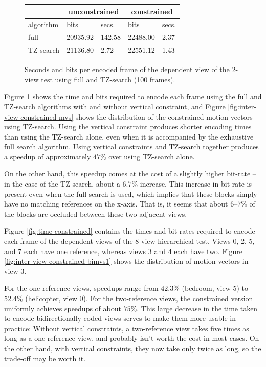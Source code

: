 \documentclass{sig-alternate-05-2015}
\begin{document}
\begin{figure}[H]
\centering\small
\begin{tabular}{|l|l|l|l|l|}
\multicolumn{1}{c}{} & \multicolumn{2}{c}{unconstrained} & \multicolumn{2}{c}{constrained} \\ \hline
algorithm            & bits            & secs.           & bits            & secs.         \\ \hline
full                 & 20935.92        & 142.58          & 22488.00        & 2.37          \\ \hline
TZ-search            & 21136.80        & 2.72            & 22551.12        & 1.43          \\ \hline
\end{tabular}
\caption{Seconds and bits per encoded frame of the dependent view of the
2-view test using full and TZ-search (100 frames).}
\label{fig:time-full-fast}
\end{figure}

Figure \ref{fig:time-full-fast} shows the time and bits required to encode each
frame using the full and TZ-search algorithms with and without vertical
constraint, and Figure \ref{fig:inter-view-constrained-mvs} shows the
distribution of the constrained motion vectors using TZ-search. Using the
vertical constraint produces shorter encoding times than using the TZ-search
alone, even when it is accompanied by the exhaustive full search algorithm.
Using vertical constraints and TZ-search together produces a speedup of
approximately $47\%$ over using TZ-search alone.

On the other hand, this speedup comes at the cost of a slightly higher bit-rate
-- in the case of the TZ-search, about a $6.7\%$ increase. This increase in
bit-rate is present even when the full search is used, which implies that these
blocks simply have no matching references on the x-axis. That is, it seems that
about $6$--$7\%$ of the blocks are occluded between these two adjacent views.

Figure \ref{fig:time-constrained} contains the times and bit-rates required
to encode each frame of the dependent views of the 8-view hierarchical test.
Views 0, 2, 5, and 7 each have one reference, whereas views 3 and 4 each have
two. Figure \ref{fig:inter-view-constrained-bimvs1} shows the distribution of
motion vectors in view 3.

For the one-reference views, speedups range from $42.3\%$ (bedroom, view 5) to
$52.4\%$ (helicopter, view 0). For the two-reference views, the
constrained version uniformly achieves speedups of about $75\%$. This large
decrease in the time taken to encode bidirectionally coded views serves to
make them more usable in practice: Without vertical constraints, a
two-reference view takes five times as long as a one reference view, and
probably isn't worth the cost in most cases. On the other hand, with vertical
constraints, they now take only twice as long, so the trade-off may be worth it.
\end{document}
